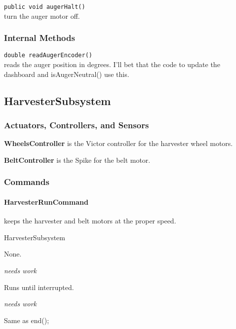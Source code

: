 \documentclass[]{article}
\begin{document}
\noindent
\lstinline[]|public void augerHalt()| \\
turn the auger motor off.

\subsubsection{Internal Methods}

\noindent
\lstinline[]|double readAugerEncoder()| \\
reads the auger position in degrees.
I'll bet that the code to update the dashboard and isAugerNeutral() use this.


\subsection{HarvesterSubsystem}

\subsubsection{Actuators, Controllers, and Sensors}

\textbf{WheelsController} is the Victor controller for the harvester wheel motors.

\textbf{BeltController} is the Spike for the belt motor.

\subsubsection{Commands}

\paragraph{HarvesterRunCommand} keeps the harvester and belt motors at the proper speed.
\begin{description}[topsep=0ex]
\item[requires] HarvesterSubsystem
\item[initialization] None.
\item[execute] \emph{needs work}
\item[isDone] Runs until interrupted.
\item[end] \emph{needs work}
\item[interrupted] Same as end();
\end{description}
\end{document}
